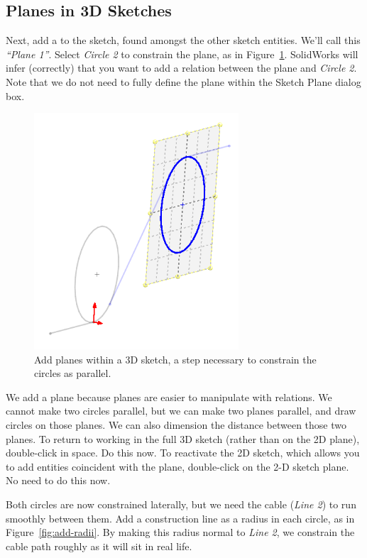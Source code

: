 \subsection{Planes in 3D Sketches}

Next, add a   to the sketch,
found amongst the other sketch entities. We'll call this \emph{``Plane 1''}. Select \emph{Circle 2} to
constrain the plane, as in Figure~\ref{fig:add-3d-sketch-plane}. SolidWorks will
infer (correctly) that you want to add a  relation between
the plane and \emph{Circle 2}. Note that we do not need to
fully define the plane within the Sketch Plane dialog box.

\begin{figure}[H]
\begin{center}
  \includegraphics[width=3in]{images/figures/add-3d-sketch-plane.png}
\end{center}
\caption{Add planes within a 3D sketch, a step necessary to constrain the
circles as parallel. \label{fig:add-3d-sketch-plane}}

\end{figure}

We add a plane because planes are easier to manipulate with relations. We cannot make two circles
parallel, but we can make two planes parallel, and draw circles on those planes.
We can also dimension the distance between those two planes. To return to working in the full 3D sketch (rather than on the 2D plane),
double-click in space. Do this now. To reactivate the 2D sketch, which allows you to add
entities coincident with the plane, double-click on the 2-D sketch plane. No
need to do this now.

Both circles are now constrained laterally, but we need the cable (\emph{Line 2}) to run
smoothly between them. Add a construction line as a radius in each circle, as in
Figure~\ref{fig:add-radii}. By making this
radius normal to \emph{Line 2}, we constrain the cable path roughly as it will sit in
real life.


